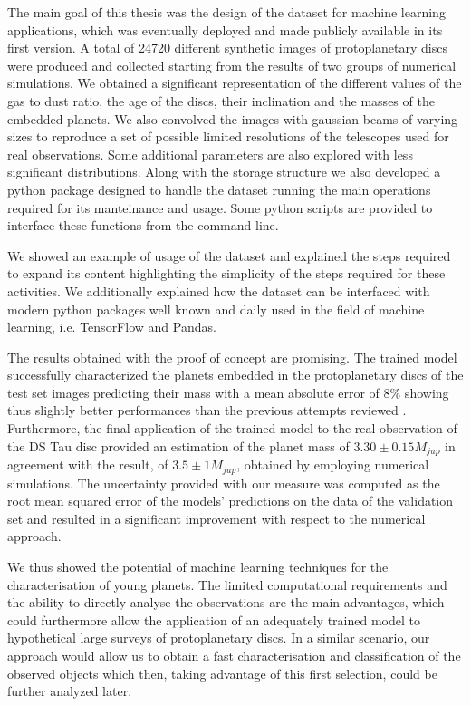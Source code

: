 \documentclass[a4paper,10pt]{report}
\begin{document}
The main goal of this thesis was the design of the dataset for machine learning applications,
which was eventually deployed and made publicly available in its first version. A total of 24720 different synthetic
images of protoplanetary discs were produced and collected starting from the results of two groups of numerical simulations.
We obtained a significant representation of the different values of the gas to dust ratio, the age of the discs,
their inclination and the masses of the embedded 
planets. We also convolved the images with gaussian beams of varying sizes to reproduce a set of possible limited resolutions
of the telescopes used for real observations. 
Some additional parameters are also explored with less significant distributions.
Along with the storage structure we also developed a python package designed to handle the dataset
running the main operations required for its manteinance and usage. 
Some python scripts are provided to interface these functions
from the command line.

We showed an example of usage of the dataset and explained the steps required to expand its content
highlighting the simplicity of the steps required for these activities.
We additionally explained how the dataset can be interfaced with modern python packages
well known and daily used in the field
of machine learning, i.e. TensorFlow and Pandas.

The results obtained with the proof of concept are promising. The trained model successfully
characterized the planets embedded in the protoplanetary discs of the test set images predicting their mass
with a mean absolute error of 8\% showing thus slightly better performances
than the previous attempts reviewed \citep{Auddy_2020}.
Furthermore, the final application of the trained model to the real observation of the DS Tau disc
provided an estimation of the planet mass of $3.30 \pm 0.15 M_{jup}$ in agreement with the result, of
$3.5 \pm 1 M_{jup}$,
obtained by \citet{dstauv} employing numerical simulations. The uncertainty provided 
with our measure was computed as the root mean squared error of the models' predictions on the data of the validation
set and resulted in a significant improvement with respect to the numerical approach.

We thus showed the potential of machine learning techniques for the characterisation of 
young planets. The limited computational requirements and the ability to
directly analyse the observations are the main advantages, which could
furthermore allow the application of an adequately trained model to hypothetical large surveys
of protoplanetary discs. In a similar scenario, our approach would allow us to obtain a fast characterisation
and classification of the observed objects which then, taking advantage of this first selection,
could be further analyzed later.
\end{document}

